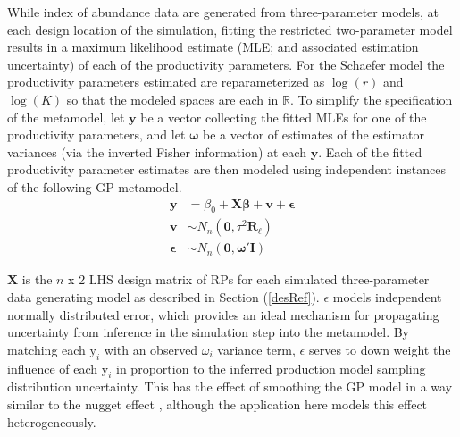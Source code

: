 %
While index of abundance data are generated from three-parameter models, at each
design location of the simulation, fitting the restricted two-parameter model
results in a maximum likelihood estimate (MLE; and associated estimation
uncertainty) of each of the productivity parameters. For the Schaefer model 
the productivity parameters estimated are reparameterized as $\log(r)$ and 
$\log(K)$ so that the modeled spaces are each in $\mathbb{R}$.
To simplify the specification of the metamodel, let $\textbf{y}$ be a vector
collecting the fitted MLEs for one of the productivity parameters, and let
$\bm{\omega}$ be a vector of estimates of the estimator variances (via the
inverted Fisher information) at each $\textbf{y}$.
%
Each of the fitted productivity parameter estimates are then modeled using
independent instances of the following GP metamodel. %
\begin{align} \label{GPModel}
        \textbf{y} &= \beta_0 + \bm{X}\bm{\beta} + \bm{v} + \bm{\epsilon} \nonumber \\
        \bm{v} &\sim N_n(\bm{0}, \tau^2 \bm{R_{\ell}}) \\
        \bm{\epsilon} &\sim N_n(\bm{0}, \bm{\omega}'\bm{I}) \nonumber
\end{align}
%


$\bm{X}$ is the $n$ x 2 LHS design matrix of RPs for each simulated %
three-parameter data generating model as described in Section (\ref{desRef}).
$\epsilon$ models independent normally distributed error, which provides an
ideal mechanism for propagating uncertainty from inference in the simulation
step into the metamodel. By matching each $\text{y}_i$ with an observed $\omega_i$
variance term, $\epsilon$ serves to down weight the influence of each $\text{y}_i$
in proportion to the inferred production model sampling distribution
uncertainty. This has the effect of smoothing the GP model in a way similar to
the nugget effect \cite{gramacy_cases_2012}, although the application
here models this effect heterogeneously.


